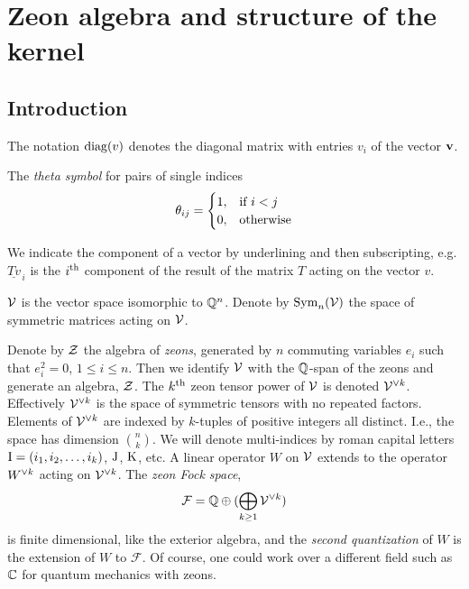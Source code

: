 


\section{Zeon algebra and structure of the kernel}
\label{sec:7.1}


\subsection{Introduction}
\label{sec:7.1.1}

The notation ${\rm diag}({v})$ denotes the diagonal matrix with entries $v_i$ of the vector $\bf v$.

The \textsl{theta symbol\/} for pairs of single indices
$$
  \theta_{ij}=\begin{cases} 
	1, & \text{if } i<j\cr  
	0, & \text{otherwise} \end{cases}
$$

We indicate the component of a vector by underlining and then subscripting, e.g. $\underline{Tv}_{\,i}$
is the $i^{\rm th}$ component of the result of the matrix $T$ acting on the vector $v$.

${\mathcal V}$ is the vector space isomorphic to $\mathbb{Q}^n$. Denote by ${\rm Sym}_n({\mathcal V})$ the space of
symmetric matrices acting on ${\mathcal V}$.

Denote by ${\mathcal Z }$ the algebra of \textsl{zeons}, generated by $n$ commuting variables $e_i$ such that
$e_i^2=0$, $1\le i \le n$. Then we identify ${\mathcal V}$ with the $\mathbb{Q}$-span of the zeons and generate
an algebra, ${\mathcal Z }$. The $k^{\rm th}$ zeon tensor power of ${\mathcal V}$ is denoted ${{\mathcal V}}^{\vee k}$. 
Effectively ${{\mathcal V}}^{\vee k}$ is the space of symmetric tensors with no repeated factors.
Elements of ${{\mathcal V}}^{\vee k}$ are indexed by $k$-tuples of positive integers all distinct. 
I.e., the space has dimension $\binom{n}{k}$. We will denote multi-indices by 
roman capital letters ${\rm I}=(i_1,i_2,\ldots,i_k)$, ${\rm J}$, ${\rm K}$, etc. 
A linear operator $W$ on ${\mathcal V}$ extends to the operator ${W}^{\vee k}$ acting on ${{\mathcal V}}^{\vee k}$.
The \textsl{zeon Fock space\/}, 
$$ 
  {\mathcal F}=\mathbb{Q}\oplus (\bigoplus_{k\ge1}{{\mathcal V}}^{\vee k})
$$
is finite dimensional, like the exterior algebra, and the \textsl{second quantization\/} of $W$ is the extension of 
$W$ to $\mathcal F$. Of course, one could work over a different field such as $\mathbb{C}$ for quantum mechanics with zeons.


